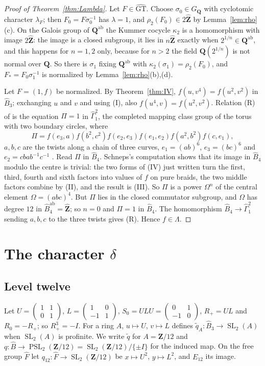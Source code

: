 \documentclass[11pt,a4paper]{article}
\theoremstyle{plain}
\theoremstyle{definition}
\theoremstyle{remark}
\newcommand{\GT}{\widehat{\mathrm{GT}}}
\newcommand{\Zh}{\widehat{\mathbf Z}}
\newcommand{\Z}{\mathbf Z}
\newcommand{\Q}{\mathbf Q}
\newcommand{\GQ}{G_{\mathbf Q}}
\newcommand{\Fh}{\widehat F}
\newcommand{\Bh}{\widehat B}
\newcommand{\Gh}{\widehat\Gamma}
\newcommand{\SL}{\operatorname{SL}}
\newcommand{\PSL}{\operatorname{PSL}}
\newcommand{\ab}{\mathrm{ab}}
\begin{document}
\begin{proof}[Proof of Theorem~\ref{thm:Lambda}]
Let $F\in\GT$. Choose $\sigma_0\in\GQ$ with cyclotomic character $\lambda_F$; then $F_0=F\sigma_0^{-1}$ has
$\lambda=1$, and $\rho_2(F_0)\in2\Zh$ by Lemma~\ref{lem:rho}(c). On the Galois group of $\Q^{\ab}$ the Kummer
cocycle $\kappa_2$ is a homomorphism with image $2\Zh$: the image is a closed subgroup, it lies in $n\Zh$ exactly
when $2^{1/n}\in\Q^{\ab}$, and this happens for $n=1,2$ only, because for $n>2$ the field $\Q(2^{1/n})$ is not
normal over $\Q$. So there is $\sigma_1$ fixing $\Q^{\ab}$ with $\kappa_2(\sigma_1)=\rho_2(F_0)$, and
$F_*=F_0\sigma_1^{-1}$ is normalized by Lemma~\ref{lem:rho}(b),(d).

Let $F=(1,f)$ be normalized. By Theorem~\ref{thm:IV}, $f(u,v^4)=f(u^2,v^2)$ in $\Bh_3$; exchanging $u$ and $v$ and
using (I), also $f(u^4,v)=f(u^2,v^2)$. Relation (R) of \cite[p.~4]{HLS} is the equation $\Pi=1$ in $\Gh_1^2$, the
completed mapping class group of the torus with two boundary circles, where
\[
 \Pi=f(e_3,a)f(b^2,c^2)f(e_2,e_3)f(e_1,e_2)f(a^2,b^2)f(c,e_1),
\]
$a,b,c$ are the twists along a chain of three curves, $e_1=(ab)^6$, $e_3=(bc)^6$ and
$e_2=cbab^{-1}c^{-1}$ \cite[p.~659]{S}. Read $\Pi$ in $\Bh_4$. Schneps's computation \cite[p.~670]{S} shows that
its image in $\Bh_4$ modulo the centre is trivial: the two forms of (IV) just written turn the first, third,
fourth and sixth factors into values of $f$ on pure braids, the two middle factors combine by (II), and the result
is (III). So $\Pi$ is a power $\Omega^n$ of the central element $\Omega=(abc)^4$. But $\Pi$ lies in the closed
commutator subgroup, and $\Omega$ has degree $12$ in $\Bh_4^{\ab}=\Zh$; so $n=0$ and $\Pi=1$ in $\Bh_4$. The
homomorphism $\Bh_4\to\Gh_1^2$ sending $a,b,c$ to the three twists gives (R). Hence $f\in\Lambda$.
\end{proof}

\section{The character \texorpdfstring{$\delta$}{delta}}\label{sec:delta}

\subsection*{Level twelve}
Let $U=\left(\begin{smallmatrix}1&1\\0&1\end{smallmatrix}\right)$,
$L=\left(\begin{smallmatrix}1&0\\-1&1\end{smallmatrix}\right)$, $S_0=ULU=\left(\begin{smallmatrix}0&1\\-1&0
\end{smallmatrix}\right)$, $R_+=UL$ and $R_0=-R_+$; so $R_+^3=-I$. For a ring $A$, $u\mapsto U$, $v\mapsto L$
defines $\tilde q_A:\Bh_3\to\SL_2(A)$ when $\SL_2(A)$ is profinite. We write $\tilde q$ for $A=\Z/12$ and
$q:\Bh\to\PSL_2(\Z/12)=\SL_2(\Z/12)/\{\pm I\}$ for the induced map. On the free group $\Fh$ let
$q_{12}:\Fh\to\SL_2(\Z/12)$ be $x\mapsto U^2$, $y\mapsto L^2$, and $E_{12}$ its image.
\end{document}
